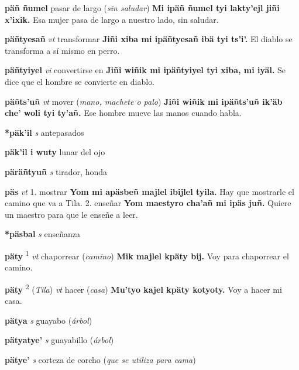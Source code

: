 \documentclass[10pt]{scrbook}
\newcommand{\entry}[1]{\textbf{#1}}
\newcommand{\onedefinition}[1]{#1.}
\newcommand{\defsuperscript}[1]{\textsuperscript{#1}}
\newcommand{\partofspeech}[1]{\textit{#1}}
\newcommand{\spanishtranslation}[1]{#1}
\newcommand{\clarification}[1]{(\textit{#1})}
\newcommand{\cholexample}[1]{\textbf{#1}}
\newcommand{\exampletranslation}[1]{#1}
\newcommand{\relevantdialect}[1]{(\textit{#1})}
\begin{document}
\begin{multicols}{2}
\entry{päñ ñumel}
\spanishtranslation{pasar de largo}
\clarification{sin saludar}
\cholexample{Mi ipäñ ñumel tyi lakty'ejl jiñi x'ixik.}
\exampletranslation{Esa mujer pasa de largo a nuestro lado, sin saludar.}

\entry{päñtyesañ}
\partofspeech{vt}
\spanishtranslation{transformar}
\cholexample{Jiñi xiba mi ipäñtyesañ ibä tyi ts'i'.}
\exampletranslation{El diablo se transforma a sí mismo en perro.}

\entry{päñtyiyel}
\partofspeech{vi}
\spanishtranslation{convertirse en}
\cholexample{Jiñi wiñik mi ipäñtyiyel tyi xiba, mi iyäl.}
\exampletranslation{Se dice que el hombre se convierte en diablo.}

\entry{päñts'uñ}
\partofspeech{vt}
\spanishtranslation{mover}
\clarification{mano, machete o palo}
\cholexample{Jiñi wiñik mi ipäñts'uñ ik'äb che' woli tyi ty'añ.}
\exampletranslation{Ese hombre mueve las manos cuando habla.}

\entry{*päk'il}
\partofspeech{s}
\spanishtranslation{antepasados}

\entry{päk'il i wuty}
\spanishtranslation{lunar del ojo}

\entry{päräñtyuñ}
\partofspeech{s}
\spanishtranslation{tirador, honda}

\entry{päs}
\partofspeech{vt}
\onedefinition{1}
\spanishtranslation{mostrar}
\cholexample{Yom mi apäsbeñ majlel ibijlel tyila.}
\exampletranslation{Hay que mostrarle el camino que va a Tila.}
\onedefinition{2}
\spanishtranslation{enseñar}
\cholexample{Yom maestyro cha'añ mi ipäs juñ.}
\exampletranslation{Quiere un maestro para que le enseñe a leer.}

\entry{*päsbal}
\partofspeech{s}
\spanishtranslation{enseñanza}

\entry{päty}
\defsuperscript{1}
\partofspeech{vt}
\spanishtranslation{chaporrear}
\clarification{camino}
\cholexample{Mik majlel kpäty bij.}
\exampletranslation{Voy para chaporrear el camino.}

\entry{päty}
\defsuperscript{2}
\relevantdialect{Tila}
\partofspeech{vt}
\spanishtranslation{hacer}
\clarification{casa}
\cholexample{Mu'tyo kajel kpäty kotyoty.}
\exampletranslation{Voy a hacer mi casa.}

\entry{pätya}
\partofspeech{s}
\spanishtranslation{guayabo}
\clarification{árbol}

\entry{pätyatye'}
\partofspeech{s}
\spanishtranslation{guayabillo}
\clarification{árbol}

\entry{pätye'}
\partofspeech{s}
\spanishtranslation{corteza de corcho}
\clarification{que se utiliza para cama}


\end{multicols}
\end{document}
